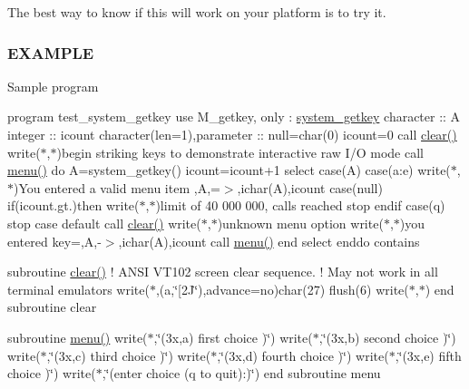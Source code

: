 The best way to know if this will work on your platform is to try it.

\subsubsection*{E\+X\+A\+M\+P\+LE}

Sample program

program test\+\_\+system\+\_\+getkey use M\+\_\+getkey, only \+: \hyperlink{interfacem__getkey_1_1system__getkey}{system\+\_\+getkey} character \+:\+: A integer \+:\+: icount character(len=1),parameter \+:\+: null=char(0) icount=0 call \hyperlink{namespacem__pixel_af3b81a21a0b2f6b5eddd09c031bd6173}{clear()} write($\ast$,$\ast$)\textquotesingle{}begin striking keys to demonstrate interactive raw I/O mode\textquotesingle{} call \hyperlink{namespacem__kracken_ad0cfac1dcc02e0a67841f546cb57f823}{menu()} do A=system\+\_\+getkey() icount=icount+1 select case(\+A) case(\textquotesingle{}a\textquotesingle{}\+:\textquotesingle{}e\textquotesingle{}) write($\ast$,$\ast$)\textquotesingle{}You entered a valid menu item \textquotesingle{},A,\textquotesingle{}=$>$\textquotesingle{},ichar(\+A),icount case(null) if(icount.\+gt.)then write($\ast$,$\ast$)\textquotesingle{}limit of 40 000 000, calls reached\textquotesingle{} stop endif case(\textquotesingle{}q\textquotesingle{}) stop case default call \hyperlink{namespacem__pixel_af3b81a21a0b2f6b5eddd09c031bd6173}{clear()} write($\ast$,$\ast$)\textquotesingle{}unknown menu option\textquotesingle{} write($\ast$,$\ast$)\textquotesingle{}you entered key=\textquotesingle{},A,\textquotesingle{}-\/$>$\textquotesingle{},ichar(\+A),icount call \hyperlink{namespacem__kracken_ad0cfac1dcc02e0a67841f546cb57f823}{menu()} end select enddo contains

subroutine \hyperlink{namespacem__pixel_af3b81a21a0b2f6b5eddd09c031bd6173}{clear()} ! A\+N\+SI V\+T102 screen clear sequence. ! May not work in all terminal emulators write($\ast$,\textquotesingle{}(a,\char`\"{}\mbox{[}2\+J\char`\"{})\textquotesingle{},advance=\textquotesingle{}no\textquotesingle{})char(27) flush(6) write($\ast$,$\ast$) end subroutine clear

subroutine \hyperlink{namespacem__kracken_ad0cfac1dcc02e0a67841f546cb57f823}{menu()} write($\ast$,\char`\"{}(3x,\textquotesingle{}a)  first choice   \textquotesingle{})\char`\"{}) write($\ast$,\char`\"{}(3x,\textquotesingle{}b)  second choice  \textquotesingle{})\char`\"{}) write($\ast$,\char`\"{}(3x,\textquotesingle{}c)  third choice   \textquotesingle{})\char`\"{}) write($\ast$,\char`\"{}(3x,\textquotesingle{}d)  fourth choice  \textquotesingle{})\char`\"{}) write($\ast$,\char`\"{}(3x,\textquotesingle{}e)  fifth choice   \textquotesingle{})\char`\"{}) write($\ast$,\char`\"{}(\textquotesingle{}enter choice (q to quit)\+:\textquotesingle{})\char`\"{}) end subroutine menu

